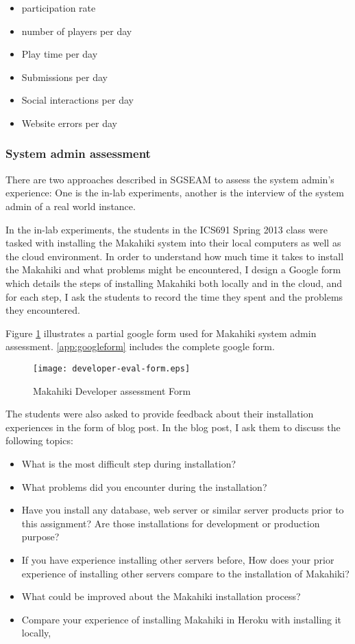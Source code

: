 \begin{itemize}
\item participation rate
\item number of players per day
\item Play time per day
\item Submissions per day
\item Social interactions per day
\item Website errors per day
\end{itemize}

\subsubsection{System admin assessment}

There are two approaches described in SGSEAM to assess the system admin's experience: One is the in-lab experiments, another is the interview of the system admin of a real world instance.

In the in-lab experiments, the students in the ICS691 Spring 2013 class were tasked with installing the Makahiki system into their local computers as well as the cloud environment. In order to understand how much time it takes to install the Makahiki and what problems might be encountered, I design a Google form which details the steps of installing Makahiki both locally and in the cloud, and for each step, I ask the students to record the time they spent and the problems they encountered.

Figure \ref{fig:developer-eval-form} illustrates a partial google form used for Makahiki system admin assessment. \autoref{app:googleform} includes the complete google form.
\begin{figure}[ht!]
   \centering
   \texttt{[image: developer-eval-form.eps]}
   \caption{Makahiki Developer assessment Form}
   \label{fig:developer-eval-form}
\end{figure}

The students were also asked to provide feedback about their installation experiences in the form of blog post. In the blog post, I ask them to discuss the following topics:
\begin{itemize}
\item What is the most difficult step during installation?
\item What problems did you encounter during the installation?
\item Have you install any database, web server or similar server products prior to this assignment? Are those installations for development or production purpose?
\item If you have experience installing other servers before, How does your prior experience of installing other servers compare to the installation of Makahiki?
\item What could be improved about the Makahiki installation process?
\item Compare your experience of installing Makahiki in Heroku with installing it locally,
\end{itemize}

